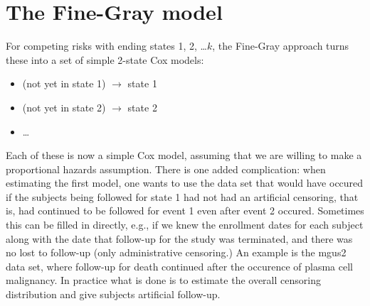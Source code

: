 \documentclass{article}
\begin{document}


\section{The Fine-Gray model}
For competing risks with ending states 1, 2, \ldots $k$, 
the Fine-Gray approach turns these into a set of simple 2-state
Cox models:
\begin{itemize}
  \item (not yet in state 1) $\longrightarrow$ state 1
  \item (not yet in state 2) $\longrightarrow$ state 2
  \item \ldots
\end{itemize}
Each of these is now a simple Cox model, assuming that we are willing
to make a proportional hazards assumption.
There is one added complication:
when estimating the first model, one wants to use the data set that
would have occured if the subjects being followed for state 1 had
not had an artificial censoring, that is, had continued to be followed
for event 1 even after event 2 occured.
Sometimes this can be filled in directly, e.g., if we knew the enrollment
dates for each subject along with the date that follow-up for the
study was terminated, and there was no lost to follow-up (only administrative
censoring.)
An example is the mgus2 data set, where follow-up for death continued
after the occurence of plasma cell malignancy.
In practice what is done is to estimate the overall censoring distribution and
give subjects artificial follow-up.
\end{document}
